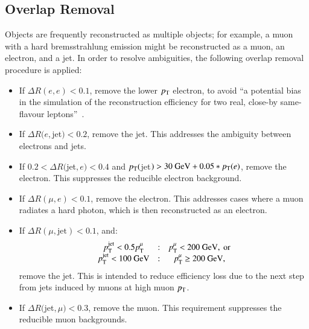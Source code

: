 \subsection{Overlap Removal}\label{sec:model-independent-overlap-removal}
Objects are frequently reconstructed as multiple objects; for example, a muon with a hard bremsstrahlung emission might be reconstructed as a muon, an electron, and a jet. In order to resolve ambiguities, the following overlap removal procedure is applied:

\begin{itemize}
	\item If $\Delta R(e, e) < 0.1$, remove the lower $p_{\text{T}}$ electron, to avoid ``a potential bias in the simulation of the reconstruction efficiency for two real, close-by same-flavour leptons''~\cite{Adams:2014wx}.
	\item If $\Delta R(e, $jet$) < 0.2$, remove the jet. This addresses the ambiguity between electrons and jets.
	\item If $0.2 < \Delta R($jet$, e) < 0.4$ and $p_{\text{T}}($jet$) > 30~\mbox{GeV} + 0.05 * p_{\text{T}}(e)$, remove the electron. This suppresses the reducible electron background.
	\item If $\Delta R(\mu, e) < 0.1$, remove the electron. This addresses cases where a muon radiates a hard photon, which is then reconstructed as an electron.
	\item If $\Delta R(\mu, \mbox{jet})<0.1$, and:
	\begin{equation}
		\begin{array}{ccc}
			p_{\text{T}}^{\mathrm{jet}}<0.5 p_{\text{T}}^{\mu} & : & p_{\text{T}}^{\mu} < 200~\mbox{GeV},\ \mbox{or} \\
			p_{\text{T}}^{\mathrm{jet}}<100~\mbox{GeV} & : & p_{\text{T}}^{\mu} \geq 200~\mbox{GeV},
		\end{array}
	\end{equation}
	remove the jet. This is intended to reduce efficiency loss due to the next step from jets induced by muons at high muon $p_{\text{T}}$. 
	\item If $\Delta R($jet$, \mu) < 0.3$, remove the muon. This requirement suppresses the reducible muon backgrounds.
\end{itemize}

